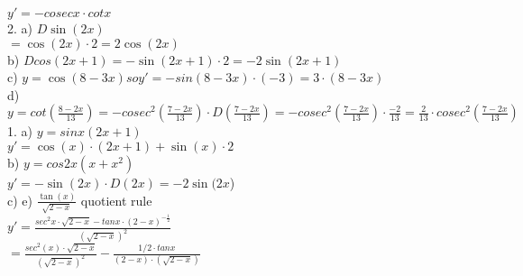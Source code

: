 \documentclass{article}
\begin{document}
  $y'=-cosec x\cdot cot x$\\
  2. a) $D \sin(2x)$\\
  $=\cos(2x)\cdot 2=2\cos(2x)$\\
  b) $D cos(2x+1)=-\sin(2x+1)\cdot2=-2\sin(2x+1)$\\
  c) $y=\cos(8-3x) so y'=-sin(8-3x)\cdot(-3)=3\cdot(8-3x)$\\
  d) $y=cot(\frac{8-2x}{13})=-cosec^2(\frac{7-2x}{13})\cdot D(\frac{7-2x}{13})=-cosec^2(\frac{7-2x}{13})\cdot\frac{-2}{13}=\frac{2}{13}\cdot cosec^2(\frac{7-2x}{13})$\\
  1. a) $y=sin x(2x+1)$\\
  $y'=\cos(x)\cdot(2x+1)+\sin(x)\cdot2$\\
  b) $y=cos 2x(x+x^2)$\\
  $y'=-\sin(2x)\cdot D(2x)=-2\sin(2x$)\\
  c) 
  e) $\frac{\tan (x)}{\sqrt{2-x}}$ quotient rule\\
  $y'=\frac{sec ^2x\cdot\sqrt{2-x}-tan x\cdot(2-x)^{-\frac{1}{2}}}{(\sqrt{2-x})^2}$\\
  $=\frac{sec^2(x)\cdot\sqrt{2-x}}{(\sqrt{2-x})^2}-\frac{1/2\cdot tan x}{(2-x)\cdot(\sqrt{2-x})}$\\

  

   
\end{document}
